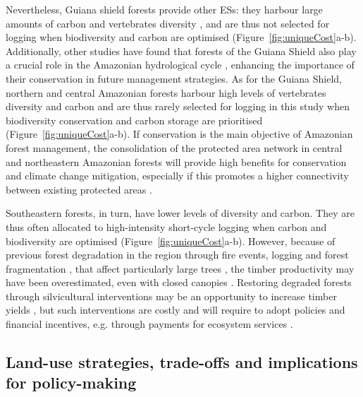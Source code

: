 \documentclass{article}
\begin{document}
Nevertheless, Guiana shield forests provide other ESs: they harbour large amounts of carbon \cite{Avitabile2016} and vertebrates diversity \cite{Jenkins2013}, and are thus not selected for logging when biodiversity and carbon are optimised (Figure~\ref{fig:uniqueCost}a-b). 
Additionally, other studies have found that forests of the Guiana Shield also play a crucial role in the Amazonian hydrological cycle \cite{Staal2018,Bovolo2018}, enhancing the importance of their conservation in future management strategies. 
As for the Guiana Shield, northern and central Amazonian forests harbour high levels of vertebrates diversity \cite{Jenkins2013} and carbon \cite{Avitabile2016} and are thus rarely selected for logging in this study when biodiversity conservation and carbon storage are prioritised (Figure~\ref{fig:uniqueCost}a-b). If conservation is the main objective of Amazonian forest management, the consolidation of the protected area network in central and northeastern Amazonian forests will provide high benefits for conservation and climate change mitigation, especially if this promotes a higher connectivity between existing protected areas \cite{Hansen2007}. 

Southeastern forests, in turn, have lower levels of diversity and carbon. They are thus often allocated to high-intensity short-cycle logging when carbon and biodiversity are optimised (Figure~\ref{fig:uniqueCost}a-b). 
However, because of previous forest degradation in the region through fire events, logging and forest fragmentation \cite{Foley2007,Davidson2012}, that affect particularly large trees \cite{Laurance2000,Gerwing2002}, the timber productivity may have been overestimated, even with closed canopies \cite{Asner2004}. Restoring degraded forests through silvicultural interventions may be an opportunity to increase timber yields \cite{Lamb2005}, but such interventions are costly and will require to adopt policies and financial incentives, e.g. through payments for ecosystem services \cite{Salzman2018}.

\subsection{Land-use strategies, trade-offs and implications for policy-making}
\end{document}
